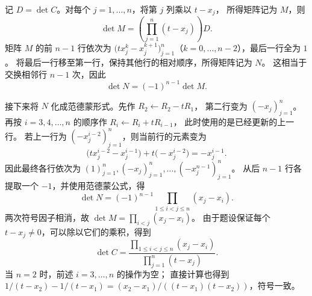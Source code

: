 \documentclass[UTF8,12pt,a4paper,fontset=fandol]{ctexart}
\begin{document}
\begin{enumerate}[label=\arabic*.]
\begin{solve}
记 $D=\det C$。对每个 $j=1,\ldots,n$，将第 $j$ 列乘以 $t-x_j$，
所得矩阵记为 $M$，则
\[
\det M=\left(\prod_{j=1}^n(t-x_j)\right)D.
\]
矩阵 $M$ 的前 $n-1$ 行依次为
$\bigl(tx_j^k-x_j^{k+1}\bigr)_{j=1}^n$（$k=0,\ldots,n-2$），最后一行全为 $1$。
将最后一行移至第一行，保持其他行的相对顺序，所得矩阵记为 $N$。
这相当于交换相邻行 $n-1$ 次，因此
\[
\det N=(-1)^{n-1}\det M.
\]

接下来将 $N$ 化成范德蒙形式。先作 $R_2\leftarrow R_2-tR_1$，
第二行变为 $(-x_j)_{j=1}^n$。
再按 $i=3,4,\ldots,n$ 的顺序作 $R_i\leftarrow R_i+tR_{i-1}$，
此时使用的是已经更新的上一行。
若上一行为 $(-x_j^{i-2})_{j=1}^n$，则当前行的元素变为
\[
\bigl(tx_j^{i-2}-x_j^{i-1}\bigr)+t\bigl(-x_j^{i-2}\bigr)=-x_j^{i-1}.
\]
因此最终各行依次为 $(1)_{j=1}^n,(-x_j)_{j=1}^n,\ldots,(-x_j^{n-1})_{j=1}^n$。
从后 $n-1$ 行各提取一个 $-1$，并使用范德蒙公式，得
\[
\det N=(-1)^{n-1}\prod_{1\leq i<j\leq n}(x_j-x_i).
\]
两次符号因子相消，故 $\det M=\prod_{i<j}(x_j-x_i)$。
由于题设保证每个 $t-x_j\ne0$，可以除以它们的乘积，得到
\[
\boxed{\det C=
\frac{\displaystyle\prod_{1\leq i<j\leq n}(x_j-x_i)}
{\displaystyle\prod_{j=1}^n(t-x_j)}.}
\]
当 $n=2$ 时，前述 $i=3,\ldots,n$ 的操作为空；
直接计算也得到 $1/(t-x_2)-1/(t-x_1)=(x_2-x_1)/((t-x_1)(t-x_2))$，符号一致。
\end{solve}

\end{enumerate}
\end{document}

